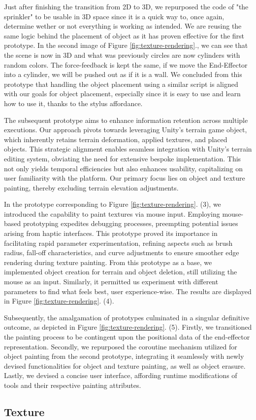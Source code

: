 Just after finishing the transition from 2D to 3D, we repurposed the code of "the sprinkler" to be usable in 3D space since it is a quick way to, once again, determine wether or not everything is working as intended.
We are reusing the same logic behind the placement of object as it has proven effective for the first prototype.
In the second image of Figure \ref{fig:texture-rendering}., we can see that the scene is now in 3D and what was previously circles are now cylinders with random colors.
The force-feedback is kept the same, if we move the End-Effector into a cylinder, we will be pushed out as if it is a wall.
We concluded from this prototype that handling the object placement using a similar script is aligned with our goals for object placement, especially since it is easy to use and learn how to use it, thanks to the stylus affordance. 

The subsequent prototype aims to enhance information retention across multiple executions. 
Our approach pivots towards leveraging Unity's terrain game object, which inherently retains terrain deformation, applied textures, and placed objects. 
This strategic alignment enables seamless integration with Unity's terrain editing system, obviating the need for extensive bespoke implementation. 
This not only yields temporal efficiencies but also enhances usability, capitalizing on user familiarity with the platform. 
Our primary focus lies on object and texture painting, thereby excluding terrain elevation adjustments. 

In the prototype corresponding to Figure \ref{fig:texture-rendering}. (3), we introduced the capability to paint textures via mouse input. 
Employing mouse-based prototyping expedites debugging processes, preempting potential issues arising from haptic interfaces. 
This prototype proved its importance in facilitating rapid parameter experimentation, refining aspects such as brush radius, fall-off characteristics, and curve adjustments to ensure smoother edge rendering during texture painting.
From this prototype as a base, we implemented object creation for terrain and object deletion, still utilizing the mouse as an input.
Similarly, it permitted us experiment with different parameters to find what feels best, user experience-wise. 
The results are displayed in Figure \ref{fig:texture-rendering}. (4).

Subsequently, the amalgamation of prototypes culminated in a singular definitive outcome, as depicted in Figure \ref{fig:texture-rendering}. (5).
Firstly, we transitioned the painting process to be contingent upon the positional data of the end-effector representation. 
Secondly, we repurposed the coroutine mechanism utilized for object painting from the second prototype, integrating it seamlessly with newly devised functionalities for object and texture painting, as well as object erasure. 
Lastly, we devised a concise user interface, affording runtime modifications of tools and their respective painting attributes.

\subsection{Texture}